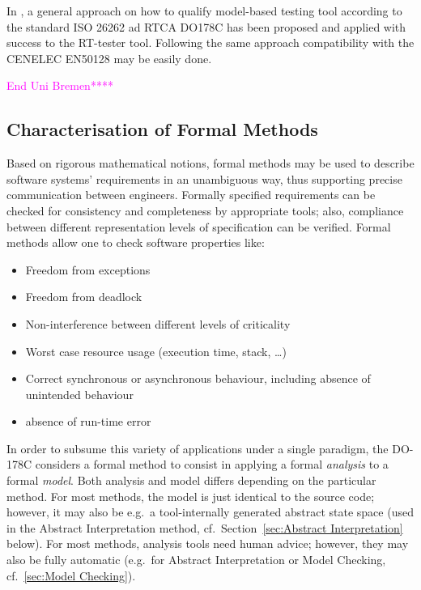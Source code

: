 \documentclass{template/openetcs_report}
\begin{document}
In \cite{brauer_efficient_2012}, a general approach  on how to qualify
model-based testing tool according to the standard ISO 26262 ad RTCA
DO178C has been proposed and applied with success to the RT-tester
tool. Following the same  approach compatibility with the CENELEC EN50128
may be easily done. 

\textcolor{magenta}{End Uni Bremen****\\ }
\subsection{Characterisation of Formal Methods}

Based on rigorous mathematical notions, formal methods may be used
to describe software systems' requirements in an unambiguous way,
thus supporting precise communication between engineers.
%
Formally specified requirements can be checked for consistency and
completeness by appropriate tools;
also, compliance between different representation levels of
specification can be verified.
%
Formal methods allow one to check software properties like:

\begin{itemize}
\item Freedom from exceptions
\item Freedom from deadlock
\item Non-interference between different levels of criticality
\item Worst case resource usage (execution time, stack, \ldots)
\item Correct synchronous or asynchronous behaviour,
        including absence of unintended behaviour
\item absence of run-time error
\end{itemize}


In order to subsume this variety of applications under a single
paradigm,
the DO-178C
considers a formal method to consist in applying a
formal {\em analysis} to a formal {\em model}.
%
Both analysis and model differs depending on the particular method.
%
For most methods, the model
is just identical to the source code; however, it may
also be e.g.\ a tool-internally generated abstract state space (used
in the Abstract Interpretation method, cf.\
Section~\ref{sec:Abstract Interpretation} below).
%
For most methods, analysis tools need human advice;
however, they may also be fully automatic (e.g.\ for 
Abstract Interpretation or Model Checking, cf.\
\ref{sec:Model Checking}).
\end{document}
